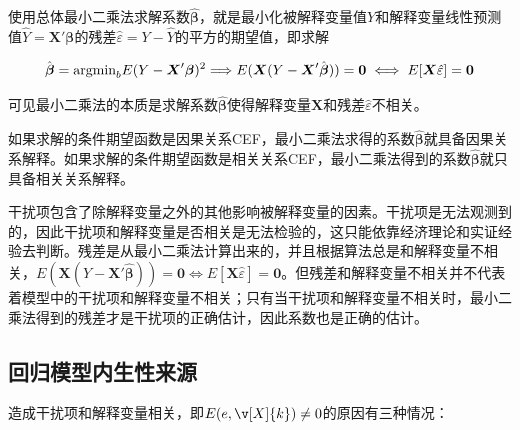 \documentclass[11pt,a4paper]{ctexart}
\newcommand{\too}{\Longrightarrow}
\newcommand{\X}{\boldsymbol{X}}
\newcommand{\ve}{\varepsilon}
\begin{document}
使用总体最小二乘法求解系数\(\hat{\boldsymbol{\beta}}\)，就是最小化被解释变量值\(Y\)和解释变量线性预测值\(\hat Y=\X'\boldsymbol\beta\)的残差\(\hat \ve=Y-\hat Y\)的平方的期望值，即求解

\[\hat{\boldsymbol\beta}= \text{argmin}_b E(Y-\X'\boldsymbol\beta)^2\\
\too E(\X(Y-\X'\hat{\boldsymbol\beta}))=\boldsymbol{0}\\
\iff E[\X\hat\ve]=\boldsymbol{0}\]

可见最小二乘法的本质是求解系数\(\hat{\boldsymbol\beta}\)使得解释变量\(\X\)和残差\(\hat\ve\)不相关。

如果求解的条件期望函数是因果关系CEF，最小二乘法求得的系数\(\hat{\boldsymbol\beta}\)就具备因果关系解释。如果求解的条件期望函数是相关关系CEF，最小二乘法得到的系数\(\hat{\boldsymbol\beta}\)就只具备相关关系解释。

干扰项包含了除解释变量之外的其他影响被解释变量的因素。干扰项是无法观测到的，因此干扰项和解释变量是否相关是无法检验的，这只能依靠经济理论和实证经验去判断。残差是从最小二乘法计算出来的，并且根据算法总是和解释变量不相关，\(E(\X(Y-\X'\hat{\boldsymbol\beta}))=\boldsymbol{0}\iff E[\X\hat\ve]=\boldsymbol{0}\)。但残差和解释变量不相关并不代表着模型中的干扰项和解释变量不相关；只有当干扰项和解释变量不相关时，最小二乘法得到的残差才是干扰项的正确估计，因此系数也是正确的估计。

\subsection{回归模型内生性来源}

造成干扰项和解释变量相关，即\(E(e,\v[X]{k})\ne 0\)的原因有三种情况：
\end{document}
